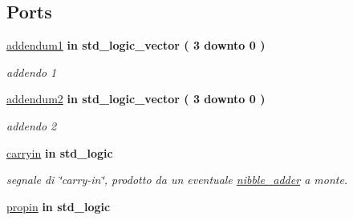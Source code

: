 \subsection*{Ports}
 \begin{DoxyCompactItemize}
\item 
\hyperlink{group___nibble_adder_ga2c8945f4747b9a5448412c95fc281c87}{addendum1}  {\bfseries {\bfseries \textcolor{vhdlchar}{in}\textcolor{vhdlchar}{ }}} {\bfseries \textcolor{vhdlchar}{std\+\_\+logic\+\_\+vector}\textcolor{vhdlchar}{ }\textcolor{vhdlchar}{(}\textcolor{vhdlchar}{ }\textcolor{vhdlchar}{ } \textcolor{vhdldigit}{3} \textcolor{vhdlchar}{ }\textcolor{vhdlchar}{downto}\textcolor{vhdlchar}{ }\textcolor{vhdlchar}{ } \textcolor{vhdldigit}{0} \textcolor{vhdlchar}{ }\textcolor{vhdlchar}{)}\textcolor{vhdlchar}{ }} 
\begin{DoxyCompactList}\small\item\em addendo 1 \end{DoxyCompactList}\item 
\hyperlink{group___nibble_adder_gad1fa6d9d78208885ad2f4c417fc4b530}{addendum2}  {\bfseries {\bfseries \textcolor{vhdlchar}{in}\textcolor{vhdlchar}{ }}} {\bfseries \textcolor{vhdlchar}{std\+\_\+logic\+\_\+vector}\textcolor{vhdlchar}{ }\textcolor{vhdlchar}{(}\textcolor{vhdlchar}{ }\textcolor{vhdlchar}{ } \textcolor{vhdldigit}{3} \textcolor{vhdlchar}{ }\textcolor{vhdlchar}{downto}\textcolor{vhdlchar}{ }\textcolor{vhdlchar}{ } \textcolor{vhdldigit}{0} \textcolor{vhdlchar}{ }\textcolor{vhdlchar}{)}\textcolor{vhdlchar}{ }} 
\begin{DoxyCompactList}\small\item\em addendo 2 \end{DoxyCompactList}\item 
\hyperlink{group___nibble_adder_gaa556a73dc4a4de1a0d662b25adbcbe33}{carryin}  {\bfseries {\bfseries \textcolor{vhdlchar}{in}\textcolor{vhdlchar}{ }}} {\bfseries \textcolor{vhdlchar}{std\+\_\+logic}\textcolor{vhdlchar}{ }} 
\begin{DoxyCompactList}\small\item\em segnale di \char`\"{}carry-\/in\char`\"{}, prodotto da un eventuale \hyperlink{classnibble__adder}{nibble\+\_\+adder} a monte. \end{DoxyCompactList}\item 
\hyperlink{group___nibble_adder_ga422e8e7ee01fc7ac7b7390cd2ad8c87b}{propin}  {\bfseries {\bfseries \textcolor{vhdlchar}{in}\textcolor{vhdlchar}{ }}} {\bfseries \textcolor{vhdlchar}{std\+\_\+logic}\textcolor{vhdlchar}{ }} 

\end{DoxyCompactItemize}
